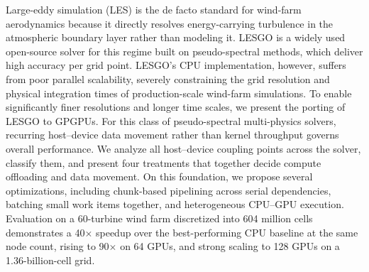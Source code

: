 Large-eddy simulation (LES) is the de facto standard for wind-farm aerodynamics
because it directly resolves energy-carrying turbulence in the atmospheric
boundary layer rather than modeling it. LESGO is a widely used open-source
solver for this regime built on pseudo-spectral methods, which deliver
high accuracy per grid point. LESGO's CPU
implementation, however, suffers from poor parallel scalability, severely
constraining the grid resolution and physical integration times of
production-scale wind-farm simulations. To enable significantly finer resolutions and longer time scales, we
present the porting of LESGO to GPGPUs. For this class of pseudo-spectral
multi-physics solvers, recurring host--device data movement rather
than kernel throughput governs overall performance. We analyze all host--device
coupling points across the solver, classify them, and present four
treatments that together decide compute offloading and data movement. On
this foundation, we propose several optimizations, including chunk-based pipelining
across serial dependencies, batching small work items together, and heterogeneous
CPU--GPU execution.  Evaluation on a 60-turbine wind farm discretized into 604 million cells
demonstrates a 40$\times$ speedup over the best-performing CPU baseline at
the same node count, rising to 90$\times$ on 64 GPUs, and strong scaling to
128 GPUs on a 1.36-billion-cell grid.
